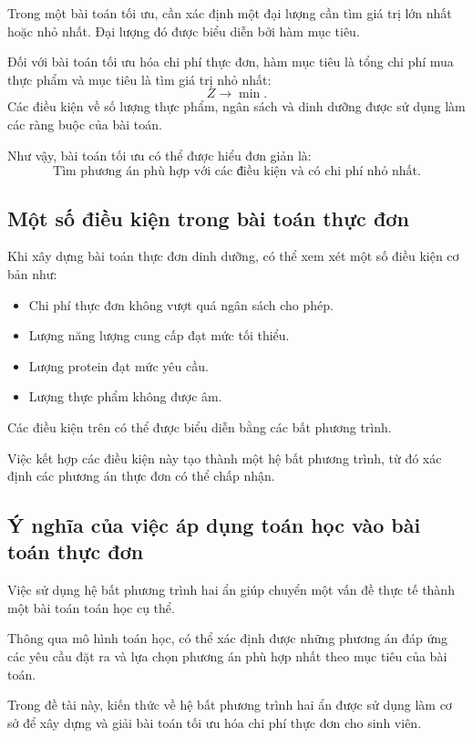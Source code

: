 \documentclass[12pt,a4paper]{article}
\begin{document}
Trong một bài toán tối ưu, cần xác định một đại lượng cần tìm giá trị lớn nhất hoặc nhỏ nhất. Đại lượng đó được biểu diễn bởi hàm mục tiêu.

Đối với bài toán tối ưu hóa chi phí thực đơn, hàm mục tiêu là tổng chi phí mua thực phẩm và mục tiêu là tìm giá trị nhỏ nhất:
\[
Z\longrightarrow\min.
\]
Các điều kiện về số lượng thực phẩm, ngân sách và dinh dưỡng được sử dụng làm các ràng buộc của bài toán.

Như vậy, bài toán tối ưu có thể được hiểu đơn giản là:
\[
\boxed{
\text{Tìm phương án phù hợp với các điều kiện và có chi phí nhỏ nhất.}
}
\]

\subsection{Một số điều kiện trong bài toán thực đơn}

Khi xây dựng bài toán thực đơn dinh dưỡng, có thể xem xét một số điều kiện cơ bản như:
\begin{itemize}
    \item Chi phí thực đơn không vượt quá ngân sách cho phép.
    \item Lượng năng lượng cung cấp đạt mức tối thiểu.
    \item Lượng protein đạt mức yêu cầu.
    \item Lượng thực phẩm không được âm.
\end{itemize}

Các điều kiện trên có thể được biểu diễn bằng các bất phương trình.

Việc kết hợp các điều kiện này tạo thành một hệ bất phương trình, từ đó xác định các phương án thực đơn có thể chấp nhận.

\subsection{Ý nghĩa của việc áp dụng toán học vào bài toán thực đơn}

Việc sử dụng hệ bất phương trình hai ẩn giúp chuyển một vấn đề thực tế thành một bài toán toán học cụ thể.

Thông qua mô hình toán học, có thể xác định được những phương án đáp ứng các yêu cầu đặt ra và lựa chọn phương án phù hợp nhất theo mục tiêu của bài toán.

Trong đề tài này, kiến thức về hệ bất phương trình hai ẩn được sử dụng làm cơ sở để xây dựng và giải bài toán tối ưu hóa chi phí thực đơn cho sinh viên.


\end{document}

